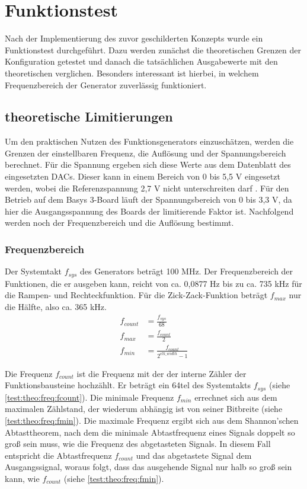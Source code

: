 \chapter{Funktionstest}
Nach der Implementierung des zuvor geschilderten Konzepts wurde ein Funktionstest durchgeführt.
Dazu werden zunächst die theoretischen Grenzen der Konfiguration getestet und danach die tatsächlichen Ausgabewerte mit den theoretischen verglichen.
Besonders interessant ist hierbei, in welchem Frequenzbereich der Generator zuverlässig funktioniert.

\section{theoretische Limitierungen}
Um den praktischen Nutzen des Funktionsgenerators einzuschätzen, werden die Grenzen der einstellbaren Frequenz, die Auflösung und der Spannungsbereich berechnet.
Für die Spannung ergeben sich diese Werte aus dem Datenblatt des eingesetzten DACs.
Dieser kann in einem Bereich von 0 bis 5,5 V eingesetzt werden, wobei die Referenzspannung 2,7 V nicht unterschreiten darf \cite{PmodDA2}.
Für den Betrieb auf dem Basys 3-Board läuft der Spannungsbereich von 0 bis 3,3 V, da hier die Ausgangsspannung des Boards der limitierende Faktor ist.
Nachfolgend werden noch der Frequenzbereich und die Auflösung bestimmt.

\subsection{Frequenzbereich}
Der Systemtakt $f_{sys}$ des Generators beträgt 100 MHz.
Der Frequenzbereich der Funktionen, die er ausgeben kann, reicht von ca. 0,0877 Hz bis zu ca. 735 kHz für die Rampen- und Rechteckfunktion.
Für die Zick-Zack-Funktion beträgt $f_{max}$ nur die Hälfte, also ca. 365 kHz.\\

\begin{align}
  f_{count} &= \frac{f_{sys}}{68} \label{test:theo:freq:fcount}\\  
  f_{max} &= \frac{f_{count}}{2}  \label{test:theo:freq:fmax}\\ 
  f_{min} &= \frac{f_{count}}{2^{clk\_width} - 1} \label{test:theo:freq:fmin}
\end{align}

Die Frequenz $f_{count}$ ist die Frequenz mit der der interne Zähler der Funktionsbausteine hochzählt.
Er beträgt ein 64tel des Systemtakts $f_{sys}$ (siehe \cref{test:theo:freq:fcount}).
Die minimale Frequenz $f_{min}$ errechnet sich aus dem maximalen Zählstand, der wiederum abhängig ist von seiner Bitbreite  (siehe \cref{test:theo:freq:fmin}).
Die maximale Frequenz ergibt sich aus dem Shannon'schen Abtasttheorem, nach dem die minimale Abtastfrequenz eines Signals doppelt so groß sein muss, wie die Frequenz des abgetasteten Signals.
In diesem Fall entspricht die Abtastfrequenz $f_{count}$ und das abgetastete Signal dem Ausgangssignal, woraus folgt, dass das ausgehende Signal nur halb so groß sein kann, wie $f_{count}$ (siehe \cref{test:theo:freq:fmin}).



